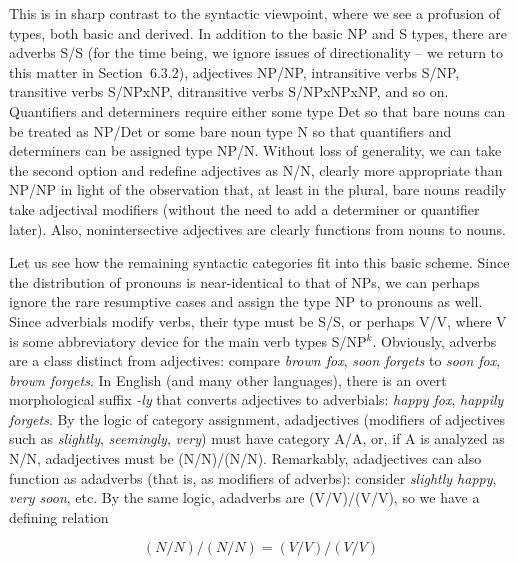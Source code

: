 This is in sharp contrast to the syntactic viewpoint, where we see a profusion
of types, both basic and derived. In addition to the basic NP and S types,
there are adverbs S/S (for the time being, we ignore issues of directionality
-- we return to this matter in Section~6.3.2), adjectives NP/NP, intransitive
verbs S/NP, transitive verbs S/NPxNP, ditransitive verbs S/NPxNPxNP, and so
on. Quantifiers and determiners require either some type Det so that bare
nouns can be treated as NP/Det or some bare noun type N so that quantifiers
and determiners can be assigned type NP/N. Without loss of generality, we can
take the second option and redefine adjectives as N/N, clearly more
appropriate than NP/NP in light of the observation that, at least in the
plural, bare nouns readily take adjectival modifiers (without the need to add
a determiner or quantifier later). Also, nonintersective adjectives are
clearly functions from nouns to nouns.

Let us see how the remaining syntactic categories fit into this basic scheme.
Since the distribution of pronouns is near-identical to that of NPs, we can
perhaps ignore the rare resumptive cases and assign the type NP to pronouns as
well. Since adverbials modify verbs, their type must be S/S, or perhaps V/V,
where V is some abbreviatory device for the main verb types
S/NP$^k$. Obviously, adverbs are a class distinct from adjectives: compare
{\it brown fox}, {\it soon forgets} to {\it *soon fox}, {\it *brown
  forgets}. In English (and many other languages), there is an overt
morphological suffix {\it -ly} that converts adjectives to adverbials: {\it
  happy fox}, {\it happily forgets}.  By the logic of category assignment,
adadjectives (modifiers of adjectives such as {\it slightly}, {\it seemingly},
{\it very}) must have category A/A, or, if A is analyzed as N/N, adadjectives
must be (N/N)/(N/N). Remarkably, adadjectives can also function as adadverbs
(that is, as modifiers of adverbs): consider {\it slightly happy}, {\it very
  soon}, etc. By the same logic, adadverbs are (V/V)/(V/V), so we have a
defining relation

\begin{equation}
(N/N)/(N/N)=(V/V)/(V/V)
\end{equation}

